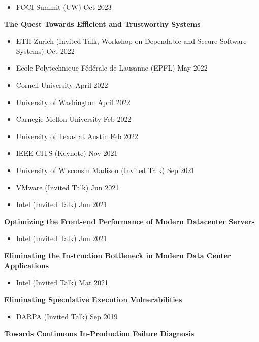 \documentclass[10pt]{article}
\newcommand{\mysub}[3]{\textbf{#1} {#2} \hfill {\em #3}}
\begin{document}
\vspace{-2mm}
\begin{itemize}
  \setlength\itemsep{0em}
\item{FOCI Summit (UW)} \hfill Oct 2023
\end{itemize}
\mysub{The Quest Towards Efficient and Trustworthy Systems}{}{}
\vspace{-2mm}
\begin{itemize}
  \setlength\itemsep{0em}
\item{ETH Zurich (Invited Talk, Workshop on Dependable and Secure Software Systems)} \hfill Oct 2022
\item{Ecole Polytechnique F\'ed\'erale de Lausanne (EPFL)} \hfill May 2022
\item{Cornell University} \hfill April 2022
\item{University of Washington} \hfill April 2022
\item{Carnegie Mellon University} \hfill Feb 2022
\item{University of Texas at Austin} \hfill Feb 2022
\item{IEEE CITS (Keynote)} \hfill Nov 2021
\item{University of Wisconsin Madison (Invited Talk)} \hfill Sep 2021
\item{VMware (Invited Talk)} \hfill Jun 2021
\item{Intel (Invited Talk)} \hfill Jun 2021
\end{itemize}
\mysub{Optimizing the Front-end Performance of Modern Datacenter Servers}{}{}
\vspace{-2mm}
\begin{itemize}
  \setlength\itemsep{0em}
\item{Intel (Invited Talk)} \hfill Jun 2021
\end{itemize}
\mysub{Eliminating the Instruction Bottleneck in Modern Data Center Applications}{}{}
\vspace{-2mm}
\begin{itemize}
  \setlength\itemsep{0em}
\item{Intel (Invited Talk)} \hfill Mar 2021
\end{itemize}
\mysub{Eliminating Speculative Execution Vulnerabilities}{}{}
\vspace{-2mm}
\begin{itemize}
  \setlength\itemsep{0em}
\item{DARPA (Invited Talk)} \hfill Sep 2019
\end{itemize}
\mysub{Towards Continuous In-Production Failure Diagnosis}{}{}
\end{document}
